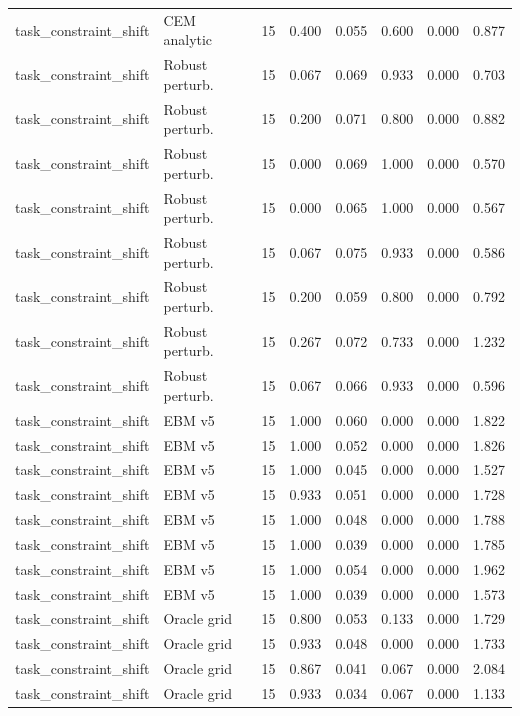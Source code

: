 {\begin{longtable}{llrrrrrr}
task\_constraint\_shift & CEM analytic & 15 & 0.400 & 0.055 & 0.600 & 0.000 & 0.877 \\
task\_constraint\_shift & Robust perturb. & 15 & 0.067 & 0.069 & 0.933 & 0.000 & 0.703 \\
task\_constraint\_shift & Robust perturb. & 15 & 0.200 & 0.071 & 0.800 & 0.000 & 0.882 \\
task\_constraint\_shift & Robust perturb. & 15 & 0.000 & 0.069 & 1.000 & 0.000 & 0.570 \\
task\_constraint\_shift & Robust perturb. & 15 & 0.000 & 0.065 & 1.000 & 0.000 & 0.567 \\
task\_constraint\_shift & Robust perturb. & 15 & 0.067 & 0.075 & 0.933 & 0.000 & 0.586 \\
task\_constraint\_shift & Robust perturb. & 15 & 0.200 & 0.059 & 0.800 & 0.000 & 0.792 \\
task\_constraint\_shift & Robust perturb. & 15 & 0.267 & 0.072 & 0.733 & 0.000 & 1.232 \\
task\_constraint\_shift & Robust perturb. & 15 & 0.067 & 0.066 & 0.933 & 0.000 & 0.596 \\
task\_constraint\_shift & EBM v5 & 15 & 1.000 & 0.060 & 0.000 & 0.000 & 1.822 \\
task\_constraint\_shift & EBM v5 & 15 & 1.000 & 0.052 & 0.000 & 0.000 & 1.826 \\
task\_constraint\_shift & EBM v5 & 15 & 1.000 & 0.045 & 0.000 & 0.000 & 1.527 \\
task\_constraint\_shift & EBM v5 & 15 & 0.933 & 0.051 & 0.000 & 0.000 & 1.728 \\
task\_constraint\_shift & EBM v5 & 15 & 1.000 & 0.048 & 0.000 & 0.000 & 1.788 \\
task\_constraint\_shift & EBM v5 & 15 & 1.000 & 0.039 & 0.000 & 0.000 & 1.785 \\
task\_constraint\_shift & EBM v5 & 15 & 1.000 & 0.054 & 0.000 & 0.000 & 1.962 \\
task\_constraint\_shift & EBM v5 & 15 & 1.000 & 0.039 & 0.000 & 0.000 & 1.573 \\
task\_constraint\_shift & Oracle grid & 15 & 0.800 & 0.053 & 0.133 & 0.000 & 1.729 \\
task\_constraint\_shift & Oracle grid & 15 & 0.933 & 0.048 & 0.000 & 0.000 & 1.733 \\
task\_constraint\_shift & Oracle grid & 15 & 0.867 & 0.041 & 0.067 & 0.000 & 2.084 \\
task\_constraint\_shift & Oracle grid & 15 & 0.933 & 0.034 & 0.067 & 0.000 & 1.133 \\

\end{longtable}}
